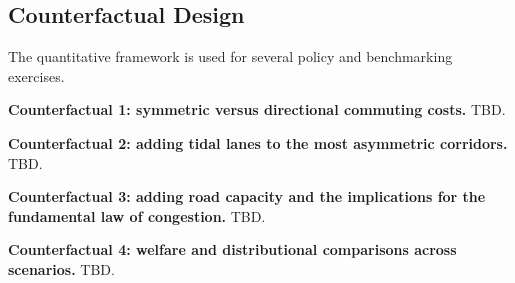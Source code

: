 \documentclass[12pt]{article}
\begin{document}
\subsection{Counterfactual Design}
The quantitative framework is used for several policy and benchmarking exercises.

\textbf{Counterfactual 1: symmetric versus directional commuting costs.} TBD.

\textbf{Counterfactual 2: adding tidal lanes to the most asymmetric corridors.} TBD.

\textbf{Counterfactual 3: adding road capacity and the implications for the fundamental law of congestion.} TBD.

\textbf{Counterfactual 4: welfare and distributional comparisons across scenarios.} TBD.
\end{document}
